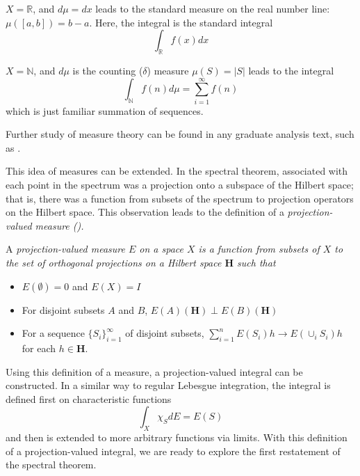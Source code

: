     \begin{example}
        $X = \mathbb{R}$, and $d\mu = dx$ leads to the standard measure on the
        real number line: $\mu([a,b]) = b-a$. Here, the integral is the standard
        integral
            \[
                \int_{\mathbb{R}}f(x)dx
            \]
    \end{example}


    \begin{example}
        $X = \mathbb{N}$, and $d\mu$ is the counting ($\delta$) measure $\mu(S)
        = |S|$ leads to the integral
        \[
            \int_{\mathbb{N}}f(n)d\mu = \sum_{i=1}^{\infty}f(n)
        \]
        which is just familiar summation of sequences.
    \end{example}
    Further study of measure theory can be found in any graduate analysis
    text, such as \cite{Lang1993}.


This idea of measures can be extended. In the spectral theorem, associated with
each point in the spectrum was a projection onto a subspace of the Hilbert
space; that is, there was a function from subsets of the spectrum to projection
operators on the Hilbert space. This observation leads to the definition of a
\em projection-valued measure \em (\cite[Ch. 6.2]{MacCluer2009}).
\begin{definition}
    A \em projection-valued measure \em $E$ on a space $X$ is a function from
    subsets of $X$ to the set of orthogonal projections on a Hilbert space
    $\textbf{H}$ such that
    \begin{itemize}
        \itemsep0em
        \item $E(\emptyset)=0$ and $E(X) = I$
        \item For disjoint subsets $A$ and $B$, $E(A)(\textbf{H})\perp
            E(B)(\textbf{H})$
        \item For a sequence $\{S_i\}_{i=1}^{\infty}$ of disjoint subsets,
            $\sum_{i=1}^nE(S_i)h \to E(\cup_i S_i)h$ for each $h\in\textbf{H}$.
    \end{itemize}
\end{definition}

Using this definition of a measure, a projection-valued integral can be
constructed. In a similar way to regular Lebesgue integration, the integral is
defined first on characteristic functions
\[
    \int_X\chi_S dE = E(S)
\]
and then is extended to more arbitrary functions via limits. With this
definition of a projection-valued integral, we are ready to explore the first
restatement of the spectral theorem.

